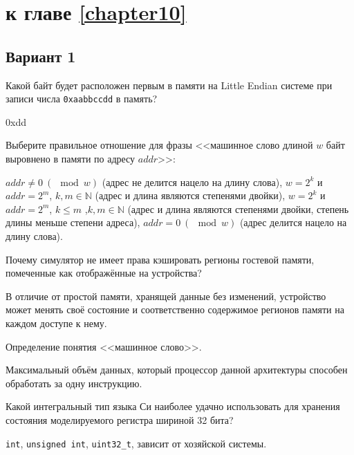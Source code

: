 \section{\Questions к главе \ref{chapter10}} %

\subsection*{Вариант 1}

\begin{questions}

\question[3] Какой байт будет расположен первым в памяти на Little Endian системе при записи числа \texttt{0xaabbccdd} в память?
\begin{solution}[1cm]
0xdd
\end{solution}

\question[3] Выберите правильное отношение для фразы <<машинное слово длиной $w$ байт выровнено в памяти по адресу $addr$>>:
\begin{choices}
	\choice $addr \neq 0\ (\mod w)$ (адрес не делится нацело на длину слова),
	\choice $w = 2^k$ и $addr = 2^m$, $k,m \in \mathbb{N}$ (адрес и длина являются степенями двойки),
	\choice $w = 2^k$ и $addr = 2^m$, $k \leq m $ ,$k,m \in \mathbb{N}$ (адрес и длина являются степенями двойки, степень длины меньше степени адреса),
    \correctchoice $addr = 0\ (\mod w)$ (адрес делится нацело на длину слова).
\end{choices}

\question[3] Почему симулятор не имеет права кэшировать регионы гостевой памяти, помеченные как отображённые на устройства?
\begin{solution}[2cm]
В отличие от простой памяти, хранящей данные без изменений, устройство может менять своё состояние и соответственно содержимое регионов памяти на каждом доступе к нему.
\end{solution}

\question[3] Определение понятия <<машинное слово>>.
\begin{solution}[1cm]
Максимальный объём данных, который процессор данной архитектуры способен обработать за одну инструкцию. 
\end{solution}

\question[3] Какой интегральный тип языка Си наиболее удачно использовать для хранения состояния моделируемого регистра шириной 32 бита?
\begin{choices}
	\choice \texttt{int},
	\choice \texttt{unsigned int},
	\correctchoice \texttt{uint32_t},
	\choice зависит от хозяйской системы.
\end{choices}

\end{questions}

